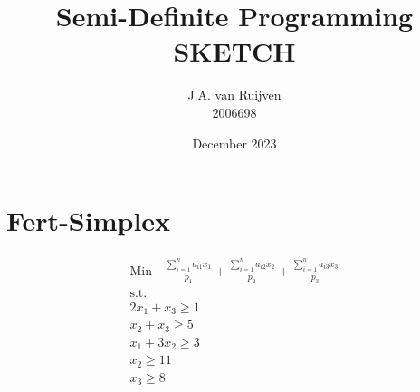\documentclass{article}
\title{Semi-Definite Programming SKETCH}
\author{J.A. van Ruijven \\ 2006698 }
\date{December 2023}
\begin{document}
\maketitle
\section{Fert-Simplex} 
\begin{align*}
	\text{Min} \quad
	\frac{\sum_{i=1}^{n}a_{i1}x_1}{p_1} +
	\frac{\sum_{i=1}^{n}a_{i2}x_2}{p_2} +
	\frac{\sum_{i=1}^{n}a_{i3}x_3}{p_3} \\
	\text{s.t.} \\
	2x_1 + x_3 \geq 1 \\
	x_2 + x_3 \geq 5 \\
	x_1 + 3x_2 \geq 3 \\
	x_2 \geq 11 \\
	x_3 \geq 8 \\
\end{align*}
\label{eq:Fert-Simplex minimization}
\end{document}
